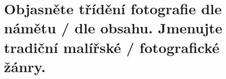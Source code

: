 \section{Objasněte třídění fotografie dle námětu / dle obsahu. Jmenujte tradiční malířské / fotografické žánry.}